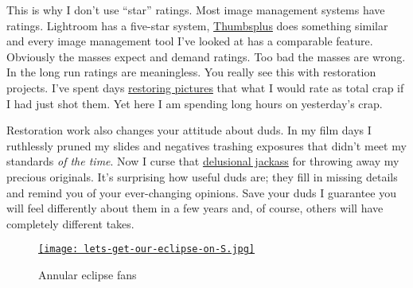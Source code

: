 This is why I don't use ``star'' ratings. Most image management systems
have ratings. Lightroom has a five-star system, \href{http://www.cerious.com}{Thumbsplus} does
something similar and every image management tool I've looked at has a
comparable feature. Obviously the masses expect and demand ratings. Too
bad the masses are wrong. In the long run ratings are meaningless. You
really see this with restoration projects. I've spent days
\href{http://conceptcontrol.smugmug.com/Themes/Manipulations/Restorations-1/7091264\_pbTtkm}{restoring
pictures} that what I would rate as total crap if I had just shot them.
Yet here I am spending long hours on yesterday's crap.

Restoration work also changes your attitude about duds. In my film days
I ruthlessly pruned my slides and negatives trashing exposures that
didn't meet my standards \emph{of the time}. Now I curse that
\href{http://conceptcontrol.smugmug.com/People/The-Way-We-Were/me-edmonton-248039614/473531869\_ocr95-L-3.jpg}{delusional
jackass} for throwing away my precious originals. It's surprising how
useful duds are; they fill in missing details and remind you of your
ever-changing opinions. Save your duds I guarantee you will feel
differently about them in a few years and, of course, others will have
completely different takes.



\begin{figure}[htbp]
\centering
\href{http://conceptcontrol.smugmug.com/Trips/USA-and-Canada/Arizona-Toodling-1/7475075\_MrjqMc}{\texttt{[image: lets-get-our-eclipse-on-S.jpg]}}
\caption{Annular eclipse fans}
\label{fig:2865X1}
\end{figure}






%